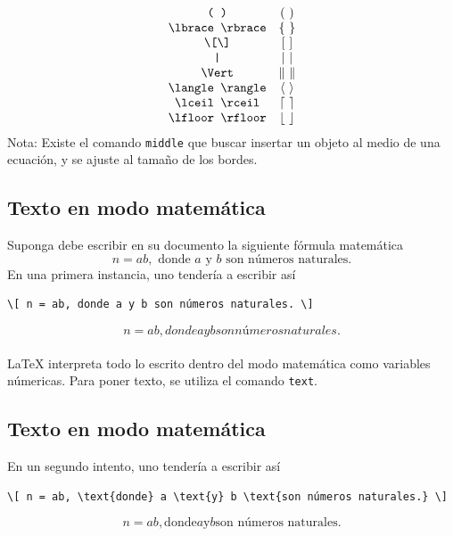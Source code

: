 \documentclass[../notes.tex]{subfiles}
\begin{document}
        \begin{align*}
            \begin{array}{cc}
                \text{\texttt{( )}} & (\ )\\
                \text{\texttt{\textbackslash lbrace \textbackslash rbrace}} & \lbrace\ \rbrace\\
                \text{\texttt{\textbackslash [\textbackslash ]}}  & [\ ]\\
                \text{\texttt{|}}  & |\ |\\
                \text{\texttt{\textbackslash Vert}}  & \Vert \ \Vert\\
                \text{\texttt{\textbackslash langle \textbackslash rangle}} & \langle\ \rangle\\
                \text{\texttt{\textbackslash lceil \textbackslash rceil}} & \lceil\ \rceil\\
                \text{\texttt{\textbackslash lfloor \textbackslash rfloor}} & \lfloor\ \rfloor
            \end{array}
        \end{align*}
        Nota: Existe el comando \texttt{middle} que buscar insertar un objeto al medio de una ecuación, y se ajuste al tamaño de los bordes.
    
    \subsection{Texto en modo matemática}
    
        Suponga debe escribir en su documento la siguiente fórmula matemática
\[ n = ab, \text{ donde } a \text{ y } b \text{ son números naturales.} \]
        En una primera instancia, uno tendería a escribir así
            \begin{verbatim}
\[ n = ab, donde a y b son números naturales. \]
            \end{verbatim}
        \[ n = ab, donde a y b son números naturales. \]\\[\baselineskip]
        
    \LaTeX{} interpreta todo lo escrito dentro del modo matemática como variables númericas. Para poner texto, se utiliza el comando \texttt{text}.
    
    \subsection{Texto en modo matemática}
    
        En un segundo intento, uno tendería a escribir así
        {\footnotesize{
            \begin{verbatim}
\[ n = ab, \text{donde} a \text{y} b \text{son números naturales.} \]
            \end{verbatim}
        }}
        \[ n = ab, \text{donde} a \text{y} b \text{son números naturales.} \]\\[\baselineskip]
        
\end{document}
